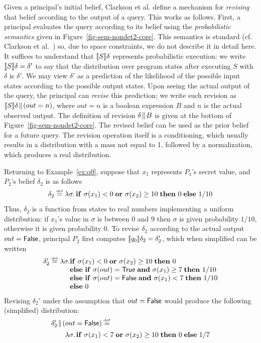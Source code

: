\documentclass[10pt]{sigplanconf}
\begin{document}
Given a principal's initial belief, Clarkson et al. define a mechanism
for \emph{revising} that belief according to the output of a query.
This works as follows.  First, a principal evaluates the query
according to its belief using the \emph{probabilistic semantics} given
in Figure~\ref{fig-sem-nondet2-core}.  This semantics is standard (cf.
Clarkson et al.~\cite{clarkson09quantifying}) so, due to space
constraints, we do not describe it in detail here.  It suffices to
understand that $[\![{S}]\!]{\delta}$ represents probabilistic
execution: we write $[\![{S}]\!]{\delta} = \delta'$ to say that the
distribution over program states after executing $ S $ with $\delta$
is $\delta'$.  We may view $\delta'$ as a prediction of the likelihood
of the possible input states according to the possible output states.
Upon seeing the actual output of the query, the principal can
\emph{revise} this prediction; we write such revision as $
[\![{S}]\!]{\delta}\!\parallel\!{\left( out = n \right)} $, where $out = n$ is a
boolean expression $B$ and $n$ is the actual observed output.  The
definition of revision $\delta\!\parallel\!{B}$ is given at the bottom of
Figure~\ref{fig-sem-nondet2-core}. The revised belief can be used as
the prior belief for a future query. The revision operation itself is
a conditioning, which usually results in a distribution with a mass
not equal to 1, followed by a normalization, which produces a real
distribution.

Returning to Example~\ref{ex:q0}, suppose that $x_1$ represents
$P_1$'s secret value, and $P_2$'s belief $\delta_2$ is as follows
$$\begin{array}{l}
\delta_2 \stackrel{\smash{\scriptscriptstyle \mathrm{def}}}= \lambda \sigma.\, \text{\textbf{if} } \sigma(x_1) < 0\; \text{\textbf{or} } \sigma(x_2) \geq
  10\; \text{\textbf{then} } 0\; \text{\textbf{else} } 1/10
\end{array}
$$
Thus, $\delta_2$ is a function from states to real numbers
implementing a uniform distribution: if $x_1$'s value in $\sigma$ is
between 0 and 9 then $\sigma$ is given probability $1/10$, otherwise
it is given probability $0$.  To revise $\delta_2$ according to the
actual output $out = \mathsf{False}$, principal $P_2$ first computes
$[\![{q_0}]\!]{\delta_2} = \delta_2'$, which when simplified can be
written
$$\begin{array}{l@{}l}
\delta_2' \defeq \lambda \sigma. & \aif \sigma(x_1) < 0\; \aor \sigma(x_2) \geq
  10\; \athen 0\\
& \aelse \aif \sigma(out) = \strue\; \aand \sigma(x_1) \geq 7\; \athen
1/10 \\
& \aelse \aif \sigma(out) = \sfalse\; \aand \sigma(x_1) < 7\; \athen
1/10 \\
& \aelse 0
\end{array}
$$
Revising $\delta_2'$ under the assumption that $out = \mathsf{False}$ would
produce the following (simplified) distribution:
$$\begin{array}{l}
\delta_2'\!\parallel\!{(out = \mathsf{False})} \stackrel{\smash{\scriptscriptstyle \mathrm{def}}}= \\[1ex]
\qquad \lambda \sigma.\,
\text{\textbf{if} } \sigma(x_1) < 7\; \text{\textbf{or} } \sigma(x_2) \geq
  10\; \text{\textbf{then} } 0\; \text{\textbf{else} } 1/7 \\
\end{array}
$$
\end{document}
